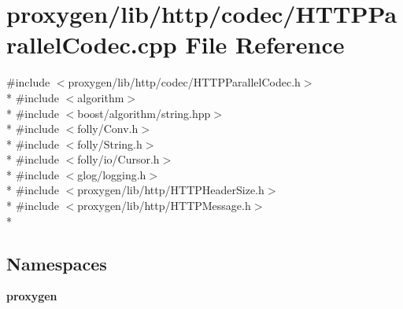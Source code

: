 \section{proxygen/lib/http/codec/\+H\+T\+T\+P\+Parallel\+Codec.cpp File Reference}
\label{HTTPParallelCodec_8cpp}
{\ttfamily \#include $<$proxygen/lib/http/codec/\+H\+T\+T\+P\+Parallel\+Codec.\+h$>$}\\*
{\ttfamily \#include $<$algorithm$>$}\\*
{\ttfamily \#include $<$boost/algorithm/string.\+hpp$>$}\\*
{\ttfamily \#include $<$folly/\+Conv.\+h$>$}\\*
{\ttfamily \#include $<$folly/\+String.\+h$>$}\\*
{\ttfamily \#include $<$folly/io/\+Cursor.\+h$>$}\\*
{\ttfamily \#include $<$glog/logging.\+h$>$}\\*
{\ttfamily \#include $<$proxygen/lib/http/\+H\+T\+T\+P\+Header\+Size.\+h$>$}\\*
{\ttfamily \#include $<$proxygen/lib/http/\+H\+T\+T\+P\+Message.\+h$>$}\\*
\subsection*{Namespaces}
\begin{DoxyCompactItemize}
\item 
 {\bf proxygen}
\end{DoxyCompactItemize}
